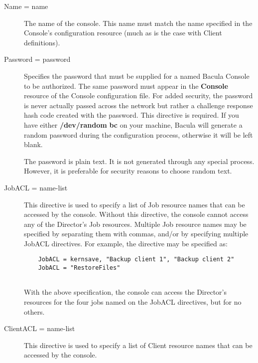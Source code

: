 \begin{description}

\item [Name = \lt{}name\gt{}]
   The name of the console. This  name must match the name specified in the
Console's configuration  resource (much as is the case with Client
definitions).  

\item [Password = \lt{}password\gt{}]
   Specifies the password that must be supplied for a named Bacula Console
   to be authorized.  The same password must appear in the {\bf Console}
   resource of the Console configuration file.  For added security, the
   password is never actually passed across the network but rather a
   challenge response hash code created with the password.  This directive
   is required.  If you have either {\bf /dev/random} {\bf bc} on your
   machine, Bacula will generate a random password during the configuration
   process, otherwise it will be left blank.

   The password is plain text.  It is not generated through any special
   process.  However, it is preferable for security reasons to choose 
   random text.      

\item [JobACL = \lt{}name-list\gt{}]
   This directive is used to specify a list of Job resource names that can
   be accessed by the console.  Without this directive, the console cannot
   access any of the Director's Job resources.  Multiple Job resource names
   may be specified by separating them with commas, and/or by specifying
   multiple JobACL directives.  For example, the directive may be specified
   as:

\footnotesize
\begin{verbatim}
    JobACL = kernsave, "Backup client 1", "Backup client 2"
    JobACL = "RestoreFiles"
    
\end{verbatim}
\normalsize

With the above specification, the console can access the Director's  resources
for the four jobs named on the JobACL directives,  but for no others.  

\item [ClientACL = \lt{}name-list\gt{}]
   This directive is used to  specify a list of Client resource names that can
be
accessed by  the console.  


\end{description}
